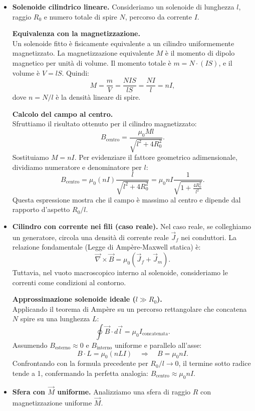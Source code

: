 \documentclass{book}
\begin{document}
\begin{itemize}
\item \textbf{Solenoide cilindrico lineare.}  
  Consideriamo un solenoide di lunghezza \(l\), raggio \(R_0\) e numero totale di spire \(N\), percorso da corrente \(I\).
  
  \textbf{Equivalenza con la magnetizzazione.} \\
  Un solenoide fitto è fisicamente equivalente a un cilindro uniformemente magnetizzato. La magnetizzazione equivalente \(M\) è il momento di dipolo magnetico per unità di volume. Il momento totale è \(m = N \cdot (I S)\), e il volume è \(V = l S\). Quindi:
  \[
  M = \frac{m}{V} = \frac{NIS}{lS} = \frac{NI}{l} = nI,
  \]
  dove \(n=N/l\) è la densità lineare di spire.
  
  \textbf{Calcolo del campo al centro.} \\
  Sfruttiamo il risultato ottenuto per il cilindro magnetizzato:
  \[
  B_{\text{centro}} = \frac{\mu_0 M l}{\sqrt{l^2 + 4R_0^2}}.
  \]
  Sostituiamo \(M = nI\). Per evidenziare il fattore geometrico adimensionale, dividiamo numeratore e denominatore per \(l\):
  \[
  B_{\text{centro}} = \mu_0 (nI) \frac{l}{\sqrt{l^2 + 4R_0^2}} = \mu_0 n I \frac{1}{\sqrt{1 + \frac{4R_0^2}{l^2}}}.
  \]
  Questa espressione mostra che il campo è massimo al centro e dipende dal rapporto d'aspetto \(R_0/l\).

\item \textbf{Cilindro con corrente nei fili (caso reale).}  
  Nel caso reale, se colleghiamo un generatore, circola una densità di corrente reale \(\vec{J}_f\) nei conduttori. La relazione fondamentale (Legge di Ampère-Maxwell statica) è:
  \[
  \vec{\nabla}\times\vec{B}=\mu_0(\vec{J}_f + \vec{J}_m).
  \]
  Tuttavia, nel vuoto macroscopico interno al solenoide, consideriamo le correnti come condizioni al contorno. 
  
  \textbf{Approssimazione solenoide ideale (\(l \gg R_0\)).} \\
  Applicando il teorema di Ampère su un percorso rettangolare che concatena \(N\) spire su una lunghezza \(L\):
  \[
  \oint \vec{B}\cdot d\vec{l} = \mu_0 I_{\text{concatenata}}.
  \]
  Assumendo \(B_{\text{esterno}} \approx 0\) e \(B_{\text{interno}}\) uniforme e parallelo all'asse:
  \[
  B \cdot L = \mu_0 (n L I) \quad \Longrightarrow \quad B = \mu_0 n I.
  \]
  Confrontando con la formula precedente per \(R_0/l \to 0\), il termine sotto radice tende a 1, confermando la perfetta analogia: \(B_{\text{centro}} \approx \mu_0 n I\).

\item \textbf{Sfera con \(\vec{M}\) uniforme.}  
  Analizziamo una sfera di raggio \(R\) con magnetizzazione uniforme \(\vec{M}\).
  

\end{itemize}
\end{document}
